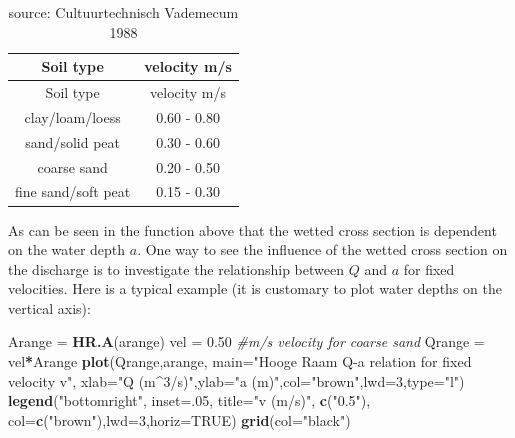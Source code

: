\documentclass[
]{article}
\newenvironment{Shaded}{\begin{snugshade}}{\end{snugshade}}
\newcommand{\AttributeTok}[1]{\textcolor[rgb]{0.13,0.29,0.53}{#1}}
\newcommand{\CommentTok}[1]{\textcolor[rgb]{0.56,0.35,0.01}{\textit{#1}}}
\newcommand{\ConstantTok}[1]{\textcolor[rgb]{0.56,0.35,0.01}{#1}}
\newcommand{\DecValTok}[1]{\textcolor[rgb]{0.00,0.00,0.81}{#1}}
\newcommand{\FloatTok}[1]{\textcolor[rgb]{0.00,0.00,0.81}{#1}}
\newcommand{\FunctionTok}[1]{\textcolor[rgb]{0.13,0.29,0.53}{\textbf{#1}}}
\newcommand{\NormalTok}[1]{#1}
\newcommand{\OtherTok}[1]{\textcolor[rgb]{0.56,0.35,0.01}{#1}}
\newcommand{\SpecialCharTok}[1]{\textcolor[rgb]{0.81,0.36,0.00}{\textbf{#1}}}
\newcommand{\StringTok}[1]{\textcolor[rgb]{0.31,0.60,0.02}{#1}}
\begin{document}
\begin{longtable}[]{@{}cc@{}}
\caption{source: Cultuurtechnisch Vademecum 1988}\tabularnewline
\toprule\noalign{}
Soil type & velocity m/s \\
\midrule\noalign{}
\endfirsthead
\toprule\noalign{}
Soil type & velocity m/s \\
\midrule\noalign{}
\endhead
\bottomrule\noalign{}
\endlastfoot
clay/loam/loess & 0.60 - 0.80 \\
sand/solid peat & 0.30 - 0.60 \\
coarse sand & 0.20 - 0.50 \\
fine sand/soft peat & 0.15 - 0.30 \\
\end{longtable}

As can be seen in the function above that the wetted cross section is
dependent on the water depth \(a\). One way to see the influence of the
wetted cross section on the discharge is to investigate the relationship
between \(Q\) and \(a\) for fixed velocities. Here is a typical example
(it is customary to plot water depths on the vertical axis):

\begin{Shaded}
\begin{Highlighting}[]
\NormalTok{Arange }\OtherTok{=}  \FunctionTok{HR.A}\NormalTok{(arange)}
\NormalTok{vel }\OtherTok{=} \FloatTok{0.50} \CommentTok{\#m/s velocity for coarse sand}
\NormalTok{Qrange }\OtherTok{=}\NormalTok{ vel}\SpecialCharTok{*}\NormalTok{Arange}
\FunctionTok{plot}\NormalTok{(Qrange,arange,}
     \AttributeTok{main=}\StringTok{"Hooge Raam Q{-}a relation for fixed velocity v"}\NormalTok{,}
     \AttributeTok{xlab=}\StringTok{"Q (m\^{}3/s)"}\NormalTok{,}\AttributeTok{ylab=}\StringTok{"a (m)"}\NormalTok{,}\AttributeTok{col=}\StringTok{"brown"}\NormalTok{,}\AttributeTok{lwd=}\DecValTok{3}\NormalTok{,}\AttributeTok{type=}\StringTok{"l"}\NormalTok{)}
\FunctionTok{legend}\NormalTok{(}\StringTok{"bottomright"}\NormalTok{, }\AttributeTok{inset=}\NormalTok{.}\DecValTok{05}\NormalTok{, }\AttributeTok{title=}\StringTok{"v (m/s)"}\NormalTok{,}
       \FunctionTok{c}\NormalTok{(}\StringTok{"0.5"}\NormalTok{), }\AttributeTok{col=}\FunctionTok{c}\NormalTok{(}\StringTok{"brown"}\NormalTok{),}\AttributeTok{lwd=}\DecValTok{3}\NormalTok{,}\AttributeTok{horiz=}\ConstantTok{TRUE}\NormalTok{)}
\FunctionTok{grid}\NormalTok{(}\AttributeTok{col=}\StringTok{"black"}\NormalTok{)}
\end{Highlighting}
\end{Shaded}
\end{document}
